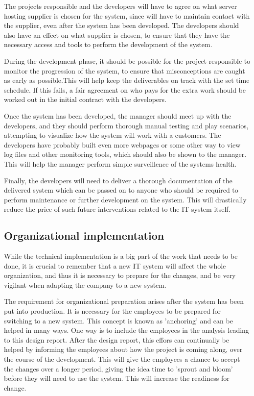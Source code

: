 The projects responsible and the developers will have to agree on what server
hosting supplier is chosen for the system, since \gomonkey{} will have to maintain
contact with the supplier, even after the system has been developed. The 
developers should also have an effect on what supplier is chosen, to ensure that
they have the necessary access and tools to perform the development of the
system.

During the development phase, it should be possible for the project responsible
to monitor the progression of the system, to ensure that misconceptions are 
caught as early as possible.This will help keep the deliverables on track with
the set time schedule. If this fails, a fair agreement on who pays for the 
extra work should be worked out in the initial contract with the developers.

Once the system has been developed, the manager should meet up with the 
developers, and they should perform thorough manual testing and play scenarios, 
attempting to visualize how the system will work with a customers. The
developers have probably built even more webpages or some other way to view 
log files and other monitoring tools, which should also be shown to the manager. 
This will help the manager perform simple surveillence of the systems health.

Finally, the developers will need to deliver a thorough documentation of the 
delivered system which can be passed on to anyone who should be required to 
perform maintenance or further development on the system. This will drastically
reduce the price of such future interventions related to the IT system itself.

\subsection{Organizational implementation}
While the technical implementation is a big part of the work that needs to be
done, it is crucial to remember that a new IT system will affect the whole 
organization, and thus it is necessary to prepare for the changes, and be very
vigilant when adapting the company to a new system. 

The requirement for organizational preparation arises after the system has been
put into production. It is necessary for the employees to be prepared for
switching to a new system. This concept is known as 'anchoring' and can be 
helped in many ways. One way is to include the employees in the analysis leading
to this design report. After the design report, this effors can continually be 
helped by informing the employees about how the project is coming along, over 
the course of the development. This will give the employees a chance to accept 
the changes over a longer period, 
giving the idea time to 'sprout and bloom' before they will need to use the 
system. This will increase the readiness for change.

